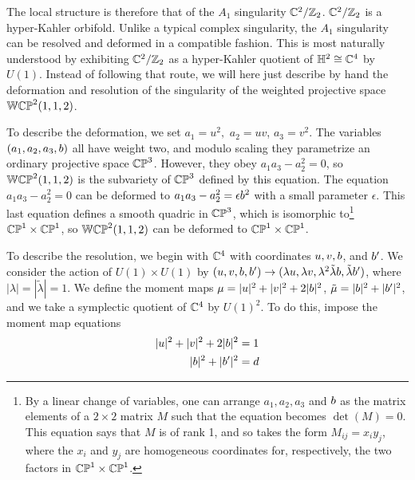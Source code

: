 The local structure is therefore that of the $A_1$ singularity
$\Bbb{C}^2/\Bbb{Z}_2$. $\Bbb{C}^2/\Bbb{Z}_2$ is a hyper-Kahler
orbifold.  Unlike a typical complex singularity, the $A_1$
singularity can be resolved and deformed in a compatible fashion.
This is most naturally understood  \cite{ref121} by exhibiting
$\Bbb{C}^2/\Bbb{Z}_2$ as a hyper-Kahler quotient of
$\Bbb{H}^2\cong \Bbb{C}^4$ by $U(1)$. Instead of following that
route, we will here just describe by hand the deformation and
resolution of the singularity of the weighted projective space
$\Bbb{WCP}^{2}(1,1,2)$.

To describe the deformation, we set $a_1=u^2,$ $a_2=uv$,
$a_3=v^2$. The variables $(a_1,a_2,a_3,b)$ all have weight two,
and modulo scaling they parametrize an ordinary projective space
$\Bbb{CP}^3$.  However, they obey $a_1a_3-a_2^2=0$, so
$\Bbb{WCP}^2(1,1,2)$ is the subvariety of $\Bbb{CP}^3$ defined by
this equation.  The equation $a_1a_3-a_2^2=0$ can be deformed to
$a_1a_3-a_2^2=\epsilon b^2$ with a small parameter $\epsilon$.
This last equation defines a smooth quadric in $\Bbb{CP}^3$, which
is isomorphic to\footnote{By a linear change of variables, one can
arrange $a_1,a_2,a_3$ and $b$ as the matrix elements of a
$2\times 2$ matrix $M$ such that the equation becomes $\det(M)=0$.
This equation says that $M$ is of rank 1, and so takes the form
$M_{ij}=x_iy_j$, where the $x_i$ and $y_j$ are homogeneous
coordinates for, respectively, the two factors in
$\Bbb{CP}^1\times \Bbb{CP}^1$.} $\Bbb{CP}^1\times \Bbb{CP}^1$, so
$\Bbb{WCP}^2(1,1,2)$ can be deformed to $\Bbb{CP}^1\times
\Bbb{CP}^1$.

To describe the resolution, we begin with $\Bbb{C}^4$ with
coordinates $u,v,b$, and $b'$.  We consider the action of
$U(1)\times U(1)$  by $(u,v,b,b')\to (\lambda u,\lambda
v,\lambda^2 \tilde \lambda b,\tilde\lambda b')$, where
$|\lambda|=|\tilde\lambda|=1$.  We define the moment maps
$\mu=|u|^2+|v|^2+2|b|^2$, $\tilde\mu= |b|^2+|b'|^2$, and we
take a symplectic quotient of $\Bbb{C}^4$ by $U(1)^2$.  To do
this, impose the moment map equations
\setcounter{equation}{21}
\begin{equation}\label{eq:ripo}
\begin{aligned}|u|^2+|v|^2+2|b|^2 & = 1\\
                                        |b|^2+|b'|^2& = d\\\end{aligned}
\end{equation}


